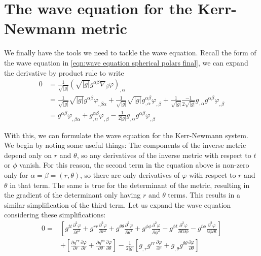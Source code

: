\documentclass[11pt]{article}
\numberwithin{equation}{section}
\numberwithin{figure}{section}
\numberwithin{table}{section}
\begin{document}
\section{The wave equation for the Kerr-Newmann metric}\label{sec:kerr metric wave equation}
\par We finally have the tools we need to tackle the wave equation. Recall the form of the wave equation in \cref{eqn:wave equation spherical polars final}, we can expand the derivative by product rule to write
\begin{align*}
    0&=\frac{1}{\sqrt{|g|}}(\sqrt{|g|}g^{\alpha\beta}\nabla_\beta\varphi)_{,\alpha}\\
    &=\frac{1}{\sqrt{|g|}}\sqrt{|g|}g^{\alpha\beta}\varphi_{,\beta\alpha}+\frac{1}{\sqrt{|g|}}\sqrt{|g|}g^{\alpha\beta}_{,\alpha}\varphi_{,\beta}+\frac{1}{\sqrt{|g|}}\frac{-1}{2\sqrt{|g|}}g_{,\alpha}g^{\alpha\beta}\varphi_{,\beta}\\
    &=g^{\alpha\beta}\varphi_{,\beta\alpha}+g^{\alpha\beta}_{,\alpha}\varphi_{,\beta}-\frac{1}{2|g|}g_{,\alpha}g^{\alpha\beta}\varphi_{,\beta}
\end{align*}
\par With this, we can formulate the wave equation for the Kerr-Newmann system. We begin by noting some useful things: The components of the inverse metric depend only on $r$ and $\theta$, so any derivatives of the inverse metric with respect to $t$ or $\phi$ vanish. For this reason, the second term in the equation above is non-zero only for $\alpha=\beta=(r,\theta)$, so there are only derivatives of $\varphi$ with respect to $r$ and $\theta$ in that term. The same is true for the determinant of the metric, resulting in the gradient of the determinant only having $r$ and $\theta$ terms. This results in a similar simplification of the third term. Let us expand the wave equation considering these simplifications:
\begin{align*}
    0=&\left[g^{tt}\frac{\partial^2\varphi}{\partial t^2}+g^{rr}\frac{\partial^2\varphi}{\partial r^2}+g^{\theta\theta}\frac{\partial^2\varphi}{\partial\theta^2}+g^{\phi\phi}\frac{\partial^2\varphi}{\partial\phi^2}-g^{\phi t}\frac{\partial^2\varphi}{\partial t\partial\phi}-g^{t\phi}\frac{\partial^2\varphi}{\partial\phi\partial t}\right]\\&+\left[\frac{\partial g^{rr}}{\partial r}\frac{\partial\varphi}{\partial r}+\frac{\partial g^{\theta\theta}}{\partial \theta}\frac{\partial \varphi}{\partial \theta}\right]-\frac{1}{2|g|}\left[g_{,r}g^{rr}\frac{\partial\varphi}{\partial r}+g_{,\theta}g^{\theta\theta}\frac{\partial\varphi}{\partial\theta}\right]
\end{align*}
\end{document}
